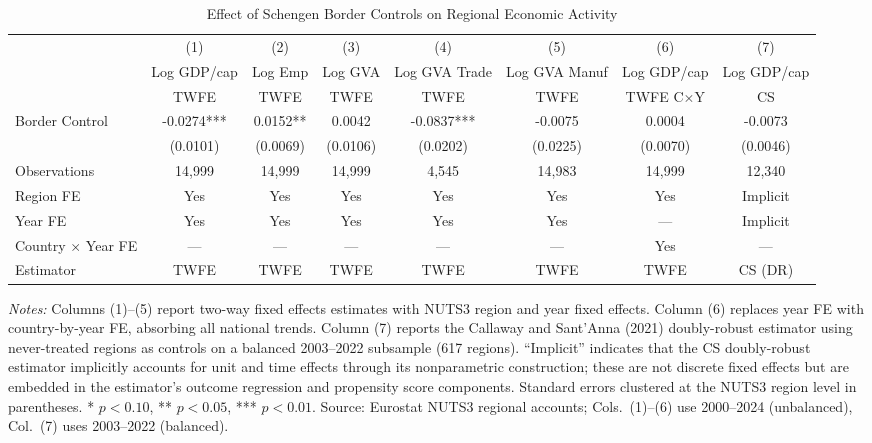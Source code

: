 \begin{table}[htbp]
\centering
\caption{Effect of Schengen Border Controls on Regional Economic Activity}
\label{tab:main}
\begin{adjustbox}{max width=\textwidth}
\begin{tabular}{lccccccc}
\toprule
 & (1) & (2) & (3) & (4) & (5) & (6) & (7) \\
 & Log GDP/cap & Log Emp & Log GVA & Log GVA Trade & Log GVA Manuf & Log GDP/cap & Log GDP/cap \\
 & TWFE & TWFE & TWFE & TWFE & TWFE & TWFE C$\times$Y & CS \\
\midrule
Border Control & -0.0274*** & 0.0152** & 0.0042 & -0.0837*** & -0.0075 & 0.0004 & -0.0073 \\
 & (0.0101) & (0.0069) & (0.0106) & (0.0202) & (0.0225) & (0.0070) & (0.0046) \\
\midrule
Observations & 14,999 & 14,999 & 14,999 & 4,545 & 14,983 & 14,999 & 12,340 \\
Region FE & Yes & Yes & Yes & Yes & Yes & Yes & Implicit \\
Year FE & Yes & Yes & Yes & Yes & Yes & --- & Implicit \\
Country $\times$ Year FE & --- & --- & --- & --- & --- & Yes & --- \\
Estimator & TWFE & TWFE & TWFE & TWFE & TWFE & TWFE & CS (DR) \\
\bottomrule
\end{tabular}
\end{adjustbox}
\begin{tablenotes}[flushleft]
\small
\item \textit{Notes:} Columns (1)--(5) report two-way fixed effects estimates with NUTS3 region and year fixed effects.
Column (6) replaces year FE with country-by-year FE, absorbing all national trends.
Column (7) reports the Callaway and Sant'Anna (2021) doubly-robust estimator using never-treated regions as controls on a balanced 2003--2022 subsample (617 regions).
``Implicit'' indicates that the CS doubly-robust estimator implicitly accounts for unit and time effects through its nonparametric construction; these are not discrete fixed effects but are embedded in the estimator's outcome regression and propensity score components.
Standard errors clustered at the NUTS3 region level in parentheses.
* $p<0.10$, ** $p<0.05$, *** $p<0.01$.
Source: Eurostat NUTS3 regional accounts; Cols.\ (1)--(6) use 2000--2024 (unbalanced), Col.\ (7) uses 2003--2022 (balanced).
\end{tablenotes}
\end{table}
